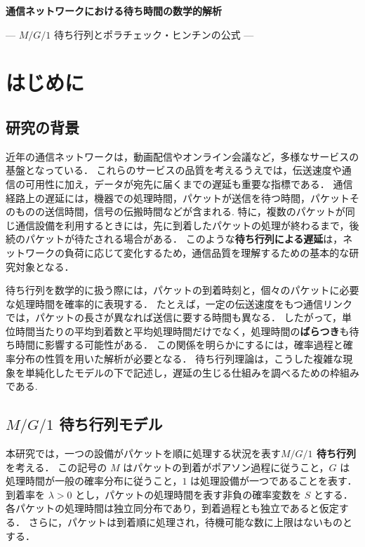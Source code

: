 \documentclass[a4paper,11pt]{article}
\begin{document}
\begin{center}
  {\large\bfseries 通信ネットワークにおける待ち時間の数学的解析}\par
  \vspace{1mm}
  {\normalsize --- $M/G/1$ 待ち行列とポラチェック・ヒンチンの公式 ---}
\end{center}
\vspace{3mm}

\section{はじめに}

\subsection{研究の背景}
近年の通信ネットワークは，動画配信やオンライン会議など，多様なサービスの基盤となっている．
これらのサービスの品質を考えるうえでは，伝送速度や通信の可用性に加え，データが宛先に届くまでの遅延も重要な指標である．
通信経路上の遅延には，機器での処理時間，パケットが送信を待つ時間，パケットそのものの送信時間，信号の伝搬時間などが含まれる.
特に，複数のパケットが同じ通信設備を利用するときには，先に到着したパケットの処理が終わるまで，後続のパケットが待たされる場合がある．
このような\textbf{待ち行列による遅延}は，ネットワークの負荷に応じて変化するため，通信品質を理解するための基本的な研究対象となる．

待ち行列を数学的に扱う際には，パケットの到着時刻と，個々のパケットに必要な処理時間を確率的に表現する．
たとえば，一定の伝送速度をもつ通信リンクでは，パケットの長さが異なれば送信に要する時間も異なる．
したがって，単位時間当たりの平均到着数と平均処理時間だけでなく，処理時間の\textbf{ばらつき}も待ち時間に影響する可能性がある．
この関係を明らかにするには，確率過程と確率分布の性質を用いた解析が必要となる．
待ち行列理論は，こうした複雑な現象を単純化したモデルの下で記述し，遅延の生じる仕組みを調べるための枠組みである.

\subsection{$M/G/1$ 待ち行列モデル}
本研究では，一つの設備がパケットを順に処理する状況を表す\textbf{$M/G/1$ 待ち行列}を考える．
この記号の $M$ はパケットの到着がポアソン過程に従うこと，$G$ は処理時間が一般の確率分布に従うこと，$1$ は処理設備が一つであることを表す．
到着率を $\lambda>0$ とし，パケットの処理時間を表す非負の確率変数を $S$ とする．
各パケットの処理時間は独立同分布であり，到着過程とも独立であると仮定する．
さらに，パケットは到着順に処理され，待機可能な数に上限はないものとする．
\end{document}
